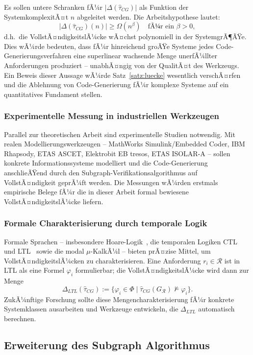 ﻿\documentclass[a4paper,12pt]{article}
\theoremstyle{definition}
\begin{document}
Es sollen untere Schranken fÃ¼r $|\Delta(\hat{\tau}_{CG})|$ als Funktion der
SystemkomplexitÃ¤t $n$ abgeleitet werden. Die Arbeitshypothese lautet:
\[
  |\Delta(\hat{\tau}_{CG})(n)| \geq \Omega(n^\beta) \quad \text{fÃ¼r ein } \beta > 0,
\]
d.h.\ die VollstÃ¤ndigkeitslÃ¼cke wÃ¤chst polynomiell in der SystemgrÃ¶ÃŸe. Dies wÃ¼rde
bedeuten, dass fÃ¼r hinreichend groÃŸe Systeme jedes Code-Generierungsverfahren
eine superlinear wachsende Menge unerfÃ¼llter Anforderungen produziert -- unabhÃ¤ngig
von der QualitÃ¤t des Werkzeugs. Ein Beweis dieser Aussage wÃ¼rde Satz~\ref{satz:luecke}
wesentlich verschÃ¤rfen und die Ablehnung von Code-Generierung fÃ¼r komplexe Systeme
auf ein quantitatives Fundament stellen.

\subsubsection{Experimentelle Messung in industriellen Werkzeugen}

Parallel zur theoretischen Arbeit sind experimentelle Studien notwendig.
Mit realen Modellierungswerkzeugen -- MathWorks Simulink/Embedded Coder, IBM Rhapsody,
ETAS ASCET, Elektrobit EB tresos, ETAS ISOLAR-A -- sollen konkrete Informationssysteme
modelliert und die Code-Generierung anschlieÃŸend durch den Subgraph-Verifikationsalgorithmus
auf VollstÃ¤ndigkeit geprÃ¼ft werden. Die Messungen wÃ¼rden erstmals empirische Belege fÃ¼r
die in dieser Arbeit formal bewiesene VollstÃ¤ndigkeitslÃ¼cke liefern.

\subsubsection{Formale Charakterisierung durch temporale Logik}

Formale Sprachen -- insbesondere Hoare-Logik~\cite{hoare1969}, die temporalen Logiken
CTL~\cite{clarke1982} und LTL~\cite{pnueli1977} sowie die modal $\mu$-KalkÃ¼l --
bieten prÃ¤zise Mittel, um VollstÃ¤ndigkeitslÃ¼cken zu charakterisieren. Eine Anforderung
$r_i \in \mathcal{R}$ ist in LTL als eine Formel $\varphi_i$ formulierbar; die
VollstÃ¤ndigkeitslÃ¼cke wird dann zur Menge
\[
  \Delta_{LTL}(\hat{\tau}_{CG}) :=
  \{\varphi_i \in \Phi \mid \hat{\tau}_{CG}(G_\mathcal{R}) \not\models \varphi_i\}.
\]
ZukÃ¼nftige Forschung sollte diese Mengencharakterisierung fÃ¼r konkrete Systemklassen
ausarbeiten und Werkzeuge entwickeln, die $\Delta_{LTL}$ automatisch berechnen.

\subsection{Erweiterung des Subgraph Algorithmus}
\end{document}
